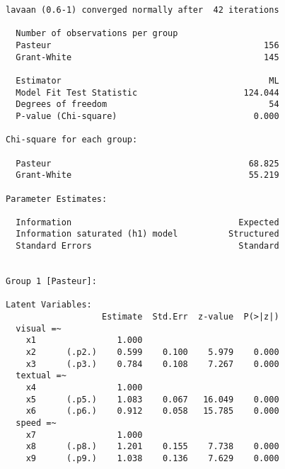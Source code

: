 \begin{Shaded}
\begin{Highlighting}[]
\StringTok{ }
            \NormalTok{,}
            \NormalTok{(}\NormalTok{))}
\end{Highlighting}
\end{Shaded}

\begin{verbatim}
lavaan (0.6-1) converged normally after  42 iterations

  Number of observations per group         
  Pasteur                                          156
  Grant-White                                      145

  Estimator                                         ML
  Model Fit Test Statistic                     124.044
  Degrees of freedom                                54
  P-value (Chi-square)                           0.000

Chi-square for each group:

  Pasteur                                       68.825
  Grant-White                                   55.219

Parameter Estimates:

  Information                                 Expected
  Information saturated (h1) model          Structured
  Standard Errors                             Standard


Group 1 [Pasteur]:

Latent Variables:
                   Estimate  Std.Err  z-value  P(>|z|)
  visual =~                                           
    x1                1.000                           
    x2      (.p2.)    0.599    0.100    5.979    0.000
    x3      (.p3.)    0.784    0.108    7.267    0.000
  textual =~                                          
    x4                1.000                           
    x5      (.p5.)    1.083    0.067   16.049    0.000
    x6      (.p6.)    0.912    0.058   15.785    0.000
  speed =~                                            
    x7                1.000                           
    x8      (.p8.)    1.201    0.155    7.738    0.000
    x9      (.p9.)    1.038    0.136    7.629    0.000


\end{verbatim}
